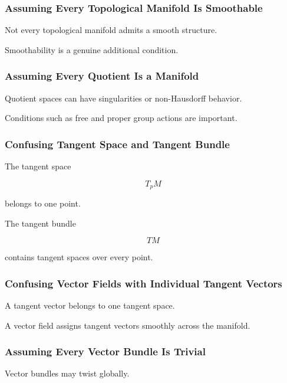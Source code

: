 \subsubsection{Assuming Every Topological Manifold Is Smoothable}

Not every topological manifold admits a smooth structure.

Smoothability is a genuine additional condition.

\subsubsection{Assuming Every Quotient Is a Manifold}

Quotient spaces can have singularities or non-Hausdorff behavior.

Conditions such as free and proper group actions are important.

\subsubsection{Confusing Tangent Space and Tangent Bundle}

The tangent space

\[
T_pM
\]

belongs to one point.

The tangent bundle

\[
TM
\]

contains tangent spaces over every point.

\subsubsection{Confusing Vector Fields with Individual Tangent Vectors}

A tangent vector belongs to one tangent space.

A vector field assigns tangent vectors smoothly across the manifold.

\subsubsection{Assuming Every Vector Bundle Is Trivial}

Vector bundles may twist globally.

